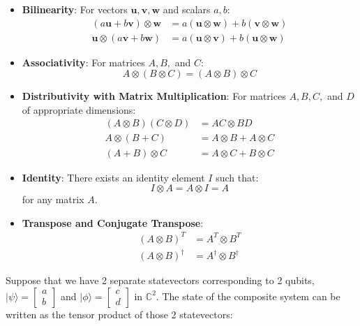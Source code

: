 \documentclass[12pt,a4paper]{report}
\begin{document}
\begin{itemize}
    \item \textbf{Bilinearity}: For vectors \( \mathbf{u}, \mathbf{v}, \mathbf{w} \) and scalars \( a, b \):
    \begin{align*}
        (a\mathbf{u} + b\mathbf{v}) \otimes \mathbf{w} &= a(\mathbf{u} \otimes \mathbf{w}) + b(\mathbf{v} \otimes \mathbf{w}) \\
        \mathbf{u} \otimes (a\mathbf{v} + b\mathbf{w}) &= a(\mathbf{u} \otimes \mathbf{v}) + b(\mathbf{u} \otimes \mathbf{w})
    \end{align*}

    \item \textbf{Associativity}: For matrices \( A, B, \) and \( C \):
    \[
        A \otimes (B \otimes C) = (A \otimes B) \otimes C
    \]

    \item \textbf{Distributivity with Matrix Multiplication}: For matrices \( A, B, C, \) and \( D \) of appropriate dimensions:
    \begin{align*}
        (A \otimes B) (C \otimes D) &= AC \otimes BD \\
        A \otimes (B + C) &= A \otimes B + A \otimes C \\
        (A + B) \otimes C &= A \otimes C + B \otimes C
    \end{align*}

    \item \textbf{Identity}: There exists an identity element \( I \) such that:
    \[
        I \otimes A = A \otimes I = A
    \]
    for any matrix \( A \).

    \item \textbf{Transpose and Conjugate Transpose}:
    \begin{align*}
        (A \otimes B)^T &= A^T \otimes B^T \\
        (A \otimes B)^\dagger &= A^\dagger \otimes B^\dagger
    \end{align*}
\end{itemize}

\noindent
Suppose that we have 2 separate statevectors corresponding to 2 qubits, \( |\psi\rangle = \begin{bmatrix} a \\ b \end{bmatrix} \) and \( |\phi\rangle = \begin{bmatrix} c \\ d \end{bmatrix} \) in \( \mathbb{C}^2 \). The state of the composite system can be written as the tensor product of those 2 statevectors:
\end{document}
